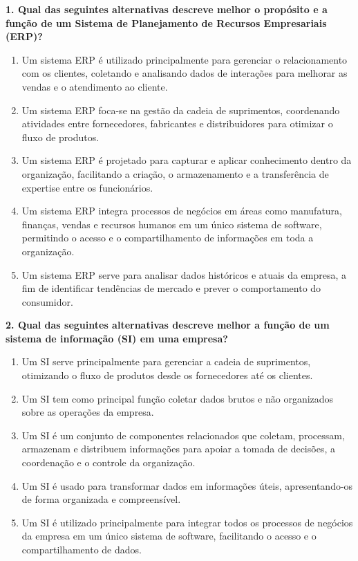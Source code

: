 \documentclass[
]{book}
\begin{document}
\textbf{1. Qual das seguintes alternativas descreve melhor o propósito e a função de um Sistema de Planejamento de Recursos Empresariais (ERP)?}

\begin{enumerate}
\def\labelenumi{\alph{enumi})}
\item
  Um sistema ERP é utilizado principalmente para gerenciar o relacionamento com os clientes, coletando e analisando dados de interações para melhorar as vendas e o atendimento ao cliente.
\item
  Um sistema ERP foca-se na gestão da cadeia de suprimentos, coordenando atividades entre fornecedores, fabricantes e distribuidores para otimizar o fluxo de produtos.
\item
  Um sistema ERP é projetado para capturar e aplicar conhecimento dentro da organização, facilitando a criação, o armazenamento e a transferência de expertise entre os funcionários.
\item
  Um sistema ERP integra processos de negócios em áreas como manufatura, finanças, vendas e recursos humanos em um único sistema de software, permitindo o acesso e o compartilhamento de informações em toda a organização.
\item
  Um sistema ERP serve para analisar dados históricos e atuais da empresa, a fim de identificar tendências de mercado e prever o comportamento do consumidor.
\end{enumerate}

\textbf{2. Qual das seguintes alternativas descreve melhor a função de um sistema de informação (SI) em uma empresa?}

\begin{enumerate}
\def\labelenumi{\alph{enumi})}
\item
  Um SI serve principalmente para gerenciar a cadeia de suprimentos, otimizando o fluxo de produtos desde os fornecedores até os clientes.
\item
  Um SI tem como principal função coletar dados brutos e não organizados sobre as operações da empresa.
\item
  Um SI é um conjunto de componentes relacionados que coletam, processam, armazenam e distribuem informações para apoiar a tomada de decisões, a coordenação e o controle da organização.
\item
  Um SI é usado para transformar dados em informações úteis, apresentando-os de forma organizada e compreensível.
\item
  Um SI é utilizado principalmente para integrar todos os processos de negócios da empresa em um único sistema de software, facilitando o acesso e o compartilhamento de dados.
\end{enumerate}
\end{document}
